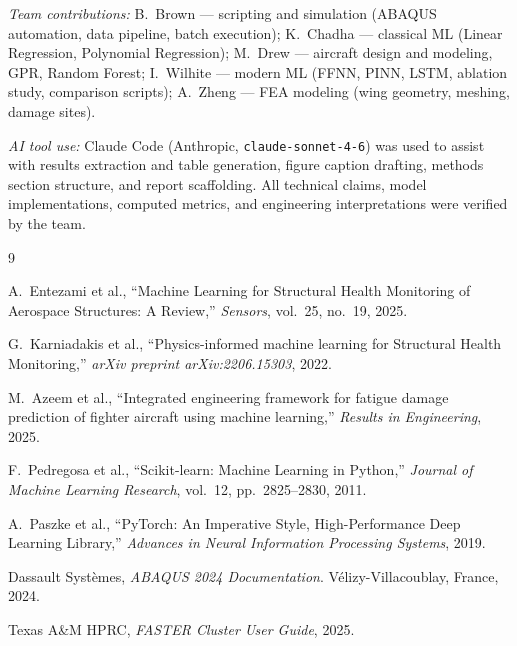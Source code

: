 \documentclass[10pt,letterpaper]{article}
\begin{document}
\textit{Team contributions:}
B.~Brown --- scripting and simulation (ABAQUS automation, data pipeline, batch execution);
K.~Chadha --- classical ML (Linear Regression, Polynomial Regression);
M.~Drew --- aircraft design and modeling, GPR, Random Forest;
I.~Wilhite --- modern ML (FFNN, PINN, LSTM, ablation study, comparison scripts);
A.~Zheng --- FEA modeling (wing geometry, meshing, damage sites).

\textit{AI tool use:} Claude Code (Anthropic, \texttt{claude-sonnet-4-6}) was used to assist
with results extraction and table generation, figure caption drafting, methods section
structure, and report scaffolding. All technical claims, model implementations, computed
metrics, and engineering interpretations were verified by the team.

\begin{thebibliography}{9}

  A.~Entezami et al., ``Machine Learning for Structural Health Monitoring of Aerospace
  Structures: A Review,'' \textit{Sensors}, vol.~25, no.~19, 2025.

  G.~Karniadakis et al., ``Physics-informed machine learning for Structural Health
  Monitoring,'' \textit{arXiv preprint arXiv:2206.15303}, 2022.

  M.~Azeem et al., ``Integrated engineering framework for fatigue damage prediction of
  fighter aircraft using machine learning,'' \textit{Results in Engineering}, 2025.

  F.~Pedregosa et al., ``Scikit-learn: Machine Learning in Python,''
  \textit{Journal of Machine Learning Research}, vol.~12, pp.~2825--2830, 2011.

  A.~Paszke et al., ``PyTorch: An Imperative Style, High-Performance Deep Learning
  Library,'' \textit{Advances in Neural Information Processing Systems}, 2019.

  Dassault Syst\`{e}mes, \textit{ABAQUS 2024 Documentation}.
  V\'{e}lizy-Villacoublay, France, 2024.

  Texas A\&M HPRC, \textit{FASTER Cluster User Guide}, 2025.

\end{thebibliography}

\appendix
\renewcommand{\thesection}{\Alph{section}}
\setcounter{figure}{0}
\renewcommand{\thefigure}{\Alph{section}\arabic{figure}}
\end{document}
